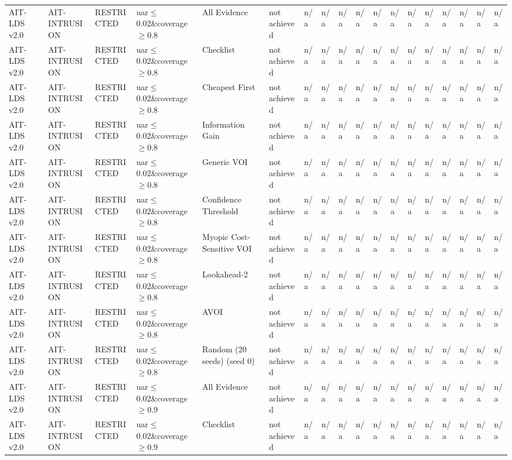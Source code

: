 \begin{table}[!ht]
{\begin{tabular}{llllllllllllllllll}
AIT-LDS v2.0 & AIT-INTRUSION & RESTRICTED & uar$\le$0.02\&coverage$\ge$0.8 & All Evidence & not achieved & n/a & n/a & n/a & n/a & n/a & n/a & n/a & n/a & n/a & n/a & n/a & n/a \\
AIT-LDS v2.0 & AIT-INTRUSION & RESTRICTED & uar$\le$0.02\&coverage$\ge$0.8 & Checklist & not achieved & n/a & n/a & n/a & n/a & n/a & n/a & n/a & n/a & n/a & n/a & n/a & n/a \\
AIT-LDS v2.0 & AIT-INTRUSION & RESTRICTED & uar$\le$0.02\&coverage$\ge$0.8 & Cheapest First & not achieved & n/a & n/a & n/a & n/a & n/a & n/a & n/a & n/a & n/a & n/a & n/a & n/a \\
AIT-LDS v2.0 & AIT-INTRUSION & RESTRICTED & uar$\le$0.02\&coverage$\ge$0.8 & Information Gain & not achieved & n/a & n/a & n/a & n/a & n/a & n/a & n/a & n/a & n/a & n/a & n/a & n/a \\
AIT-LDS v2.0 & AIT-INTRUSION & RESTRICTED & uar$\le$0.02\&coverage$\ge$0.8 & Generic VOI & not achieved & n/a & n/a & n/a & n/a & n/a & n/a & n/a & n/a & n/a & n/a & n/a & n/a \\
AIT-LDS v2.0 & AIT-INTRUSION & RESTRICTED & uar$\le$0.02\&coverage$\ge$0.8 & Confidence Threshold & not achieved & n/a & n/a & n/a & n/a & n/a & n/a & n/a & n/a & n/a & n/a & n/a & n/a \\
AIT-LDS v2.0 & AIT-INTRUSION & RESTRICTED & uar$\le$0.02\&coverage$\ge$0.8 & Myopic Cost-Sensitive VOI & not achieved & n/a & n/a & n/a & n/a & n/a & n/a & n/a & n/a & n/a & n/a & n/a & n/a \\
AIT-LDS v2.0 & AIT-INTRUSION & RESTRICTED & uar$\le$0.02\&coverage$\ge$0.8 & Lookahead-2 & not achieved & n/a & n/a & n/a & n/a & n/a & n/a & n/a & n/a & n/a & n/a & n/a & n/a \\
AIT-LDS v2.0 & AIT-INTRUSION & RESTRICTED & uar$\le$0.02\&coverage$\ge$0.8 & AVOI & not achieved & n/a & n/a & n/a & n/a & n/a & n/a & n/a & n/a & n/a & n/a & n/a & n/a \\
AIT-LDS v2.0 & AIT-INTRUSION & RESTRICTED & uar$\le$0.02\&coverage$\ge$0.8 & Random (20 seeds) (seed 0) & not achieved & n/a & n/a & n/a & n/a & n/a & n/a & n/a & n/a & n/a & n/a & n/a & n/a \\
AIT-LDS v2.0 & AIT-INTRUSION & RESTRICTED & uar$\le$0.02\&coverage$\ge$0.9 & All Evidence & not achieved & n/a & n/a & n/a & n/a & n/a & n/a & n/a & n/a & n/a & n/a & n/a & n/a \\
AIT-LDS v2.0 & AIT-INTRUSION & RESTRICTED & uar$\le$0.02\&coverage$\ge$0.9 & Checklist & not achieved & n/a & n/a & n/a & n/a & n/a & n/a & n/a & n/a & n/a & n/a & n/a & n/a \\

\end{tabular}}
\end{table}
